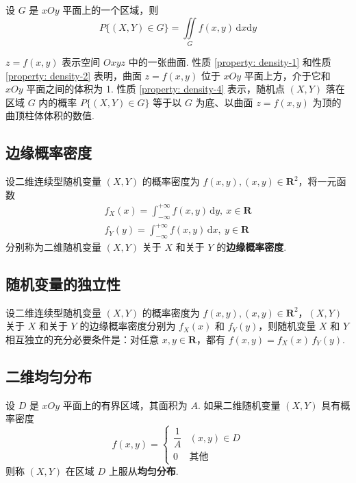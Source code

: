\begin{property} \label{property: density-4}
    设 $G$ 是 $xOy$ 平面上的一个区域，则
    $$
    P\{(X,Y) \in G\} = \underset{G}{\iint} f(x,y) \, \text{d}x \text{d}y
    $$
\end{property}

$z=f(x,y)$ 表示空间 $Oxyz$ 中的一张曲面. 性质 \ref*{property: density-1} 和性质 \ref*{property: density-2} 表明，曲面 $z=f(x,y)$ 位于 $xOy$ 平面上方，介于它和 $xOy$ 平面之间的体积为 1. 性质 \ref*{property: density-4} 表示，随机点 $(X,Y)$ 落在区域 $G$ 内的概率 $P\{(X,Y) \in G\}$ 等于以 $G$ 为底、以曲面 $z=f(x,y)$ 为顶的曲顶柱体体积的数值.

\subsection{边缘概率密度}

\begin{definition}
    设二维连续型随机变量 $(X,Y)$ 的概率密度为 $f(x,y), (x,y) \in \mathbf{R}^2$，将一元函数
    \begin{gather*}
        f_{X}(x) = \int_{-\infty}^{+\infty} f(x,y) \, \text{d}y, \ x \in \mathbf{R} \\
        f_{Y}(y) = \int_{-\infty}^{+\infty} f(x,y) \, \text{d}x, \ y \in \mathbf{R}
    \end{gather*}
    分别称为二维随机变量 $(X,Y)$ 关于 $X$ 和关于 $Y$ 的\textbf{边缘概率密度}.
\end{definition}

\subsection{随机变量的独立性}

设二维连续型随机变量 $(X,Y)$ 的概率密度为 $f(x,y), (x,y) \in \mathbf{R}^2$，$(X,Y)$ 关于 $X$ 和关于 $Y$ 的边缘概率密度分别为 $f_{X}(x)$ 和 $f_{Y}(y)$，则随机变量 $X$ 和 $Y$ 相互独立的充分必要条件是：对任意 $x,y \in \mathbf{R}$，都有 $f(x,y)=f_{X}(x) \, f_{Y}(y)$.

\subsection{二维均匀分布}

设 $D$ 是 $xOy$ 平面上的有界区域，其面积为 $A$. 如果二维随机变量 $(X,Y)$ 具有概率密度
$$
f(x,y)=\begin{cases}
    \dfrac{1}{A} & (x,y) \in D \\[0.5em]
    0 & 其他
\end{cases}
$$
则称 $(X,Y)$ 在区域 $D$ 上服从\textbf{均匀分布}.

